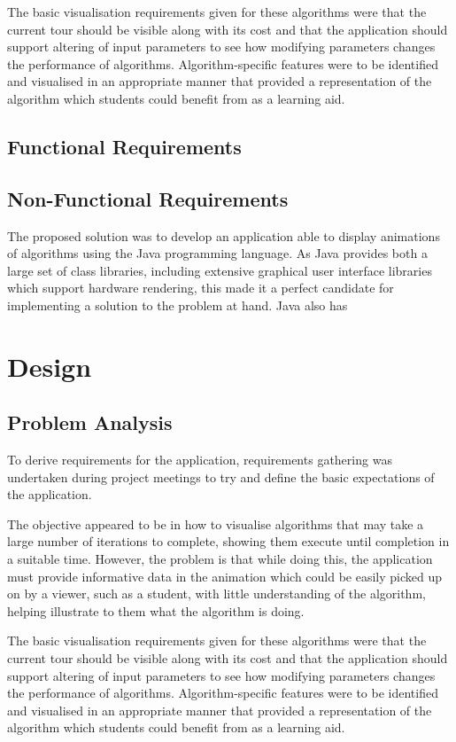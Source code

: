 \documentclass{l4proj}
\begin{document}
The basic visualisation requirements given for these algorithms were that the current tour should be visible along with its cost and 
that the application should support altering of input parameters to see how modifying parameters changes the performance of algorithms. 
Algorithm-specific features were to be identified and visualised in an appropriate manner that provided a representation of the 
algorithm which students could benefit from as a learning aid.

\section{Functional Requirements}

\section{Non-Functional Requirements}
The proposed solution was to develop an application able to display animations of algorithms using the Java programming 
language. As Java provides both a large set of class libraries, including extensive graphical user interface libraries which 
support hardware rendering, this made it a perfect candidate for implementing a solution to the problem at hand. Java also has 


\chapter{Design}
\label{design}
\section{Problem Analysis}
To derive requirements for the application, requirements gathering was undertaken during project meetings to try and define the basic 
expectations of the application.

The objective appeared to be in how to visualise algorithms that may take a large number of iterations to complete, showing them execute until 
completion in a suitable time. However, the problem is that while doing this, the application must provide informative data in the animation 
which could be easily picked up on by a viewer, such as a student, with little understanding of the algorithm, helping illustrate to them 
what the algorithm is doing.

The basic visualisation requirements given for these algorithms were that the current tour should be visible along with its cost and 
that the application should support altering of input parameters to see how modifying parameters changes the performance of algorithms. 
Algorithm-specific features were to be identified and visualised in an appropriate manner that provided a representation of the 
algorithm which students could benefit from as a learning aid.
\end{document}
